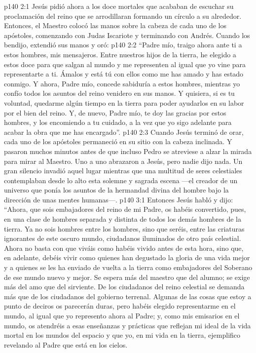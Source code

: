 \vs p140 2:1 Jesús pidió ahora a los doce mortales que acababan de escuchar su proclamación del reino que se arrodillaran formando un círculo a su alrededor. Entonces, el Maestro colocó las manos sobre la cabeza de cada uno de los apóstoles, comenzando con Judas Iscariote y terminando con Andrés. Cuando los bendijo, extendió sus manos y oró:
\vs p140 2:2 “Padre mío, traigo ahora ante ti a estos hombres, mis mensajeros. Entre nuestros hijos de la tierra, he elegido a estos doce para que salgan al mundo y me representen al igual que yo vine para representarte a ti. Ámalos y está tú con ellos como me has amado y has estado conmigo. Y ahora, Padre mío, concede sabiduría a estos hombres, mientras yo confío todos los asuntos del reino venidero en sus manos. Y quisiera, si es tu voluntad, quedarme algún tiempo en la tierra para poder ayudarlos en su labor por el bien del reino. Y, de nuevo, Padre mío, te doy las gracias por estos hombres, y los encomiendo a tu cuidado, a la vez que yo sigo adelante para acabar la obra que me has encargado”.
\vs p140 2:3 \pc Cuando Jesús terminó de orar, cada uno de los apóstoles permaneció en su sitio con la cabeza inclinada. Y pasaron muchos minutos antes de que incluso Pedro se atreviese a alzar la mirada para mirar al Maestro. Uno a uno abrazaron a Jesús, pero nadie dijo nada. Un gran silencio invadió aquel lugar mientras que una multitud de seres celestiales contemplaban desde lo alto esta solemne y sagrada escena ---el creador de un universo que ponía los asuntos de la hermandad divina del hombre bajo la dirección de unas mentes humanas---.
\vs p140 3:1 Entonces Jesús habló y dijo: “Ahora, que sois embajadores del reino de mi Padre, os habéis convertido, pues, en una clase de hombres separada y distinta de todos los demás hombres de la tierra. Ya no sois hombres entre los hombres, sino que seréis, entre las criaturas ignorantes de este oscuro mundo, ciudadanos iluminados de otro país celestial. Ahora no basta con que viváis como habéis vivido antes de esta hora, sino que, en adelante, debéis vivir como quienes han degustado la gloria de una vida mejor y a quienes se les ha enviado de vuelta a la tierra como embajadores del Soberano de ese mundo nuevo y mejor. Se espera más del maestro que del alumno; se exige más del amo que del sirviente. De los ciudadanos del reino celestial se demanda más que de los ciudadanos del gobierno terrenal. Algunas de las cosas que estoy a punto de deciros os parecerán duras, pero habéis elegido representarme en el mundo, al igual que yo represento ahora al Padre; y, como mis emisarios en el mundo, os atendréis a esas enseñanzas y prácticas que reflejan mi ideal de la vida mortal en los mundos del espacio y que yo, en mi vida en la tierra, ejemplifico revelando al Padre que está en los cielos.

